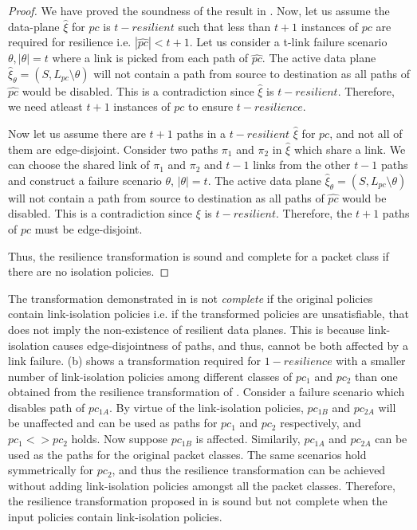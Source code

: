 \iffull
	\begin{proof}
		We have proved the soundness of the result in . 
		Now, let us assume the data-plane $\hat{\xi}$ for $pc$ is $t-resilient$ such 
		that less than $t+1$ instances of $pc$ are required for resilience i.e. 
		$|\hat{pc}| < t+1$. Let us consider a 
		t-link failure scenario $\theta, |\theta| = t$ where a link is picked from
		each path of $\hat{pc}$. The active data plane
		$\hat{\xi}_\theta = (S, L_{pc} \setminus \theta)$ will not contain a
		path from source to destination as all paths of $\hat{pc}$ would be disabled.  
		This is a contradiction since $\hat{\xi}$ is $t-resilient$. 
		Therefore, we need atleast $t+1$ instances of $pc$ to ensure $t-resilience$.
		
		Now let us assume there are $t+1$ paths in a $t-resilient$ $\hat{\xi}$ for $pc$,
		and not all of them are edge-disjoint. Consider two paths $\pi_1$ and $\pi_2$
		in $\hat{\xi}$ which share a link. We can choose the shared link 
		of $\pi_1$ and $\pi_2$ and $t-1$ links from the other $t-1$ paths 
		and construct a failure scenario $\theta$, $|\theta| = t$.
		The active data plane
		$\hat{\xi}_\theta = (S, L_{pc} \setminus \theta)$ will not contain a
		path from source to destination as all paths of $\hat{pc}$ would be disabled.  
		This is a contradiction since $\xi$ is $t-resilient$. Therefore,
		the $t+1$ paths of $pc$ must be edge-disjoint. 
		
		\noindent Thus, the resilience transformation is sound and complete for a  
		packet class if there are no isolation policies.
	\end{proof}
\fi
\noindent The transformation demonstrated in  is not \emph{complete}
 if the original policies contain link-isolation policies i.e. if the transformed policies
 are unsatisfiable, 
 that does not imply the non-existence of resilient data planes. 
 This is because link-isolation causes edge-disjointness of paths,
 and thus, cannot be both affected by a link failure. 
 (b) shows a transformation required for $1-resilience$ 
 with a smaller number of link-isolation policies among different classes
 of $pc_1$ and $pc_2$ than one obtained from 
 the resilience transformation of . 
 Consider a failure scenario which disables path
 of $pc_{1A}$. By virtue of the link-isolation policies, $pc_{1B}$ and
 $pc_{2A}$ will be unaffected and can be used as paths for $pc_1$ 
 and $pc_2$ respectively, and $pc_1 <> pc_2$ holds. Now suppose
 $pc_{1B}$ is affected. Similarily, $pc_{1A}$ and $pc_{2A}$ can be used as
 the paths for the original packet classes. The same scenarios hold symmetrically
 for $pc_2$, and thus the resilience transformation can be achieved without
 adding link-isolation policies amongst all the packet classes. Therefore,
 the resilience transformation proposed in  is sound but not
 complete when the input policies contain link-isolation policies. 
 
